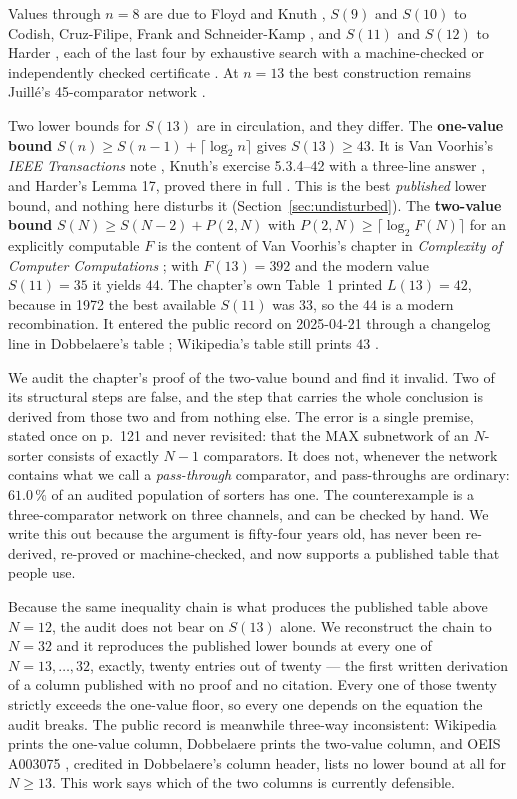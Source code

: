 \documentclass[11pt,a4paper]{article}
\begin{document}
\noindent
Values through $n=8$ are due to Floyd and Knuth \cite{FK73}, $S(9)$ and $S(10)$
to Codish, Cruz-Filipe, Frank and Schneider-Kamp \cite{CCFS16}, and $S(11)$ and
$S(12)$ to Harder \cite{Ha20}, each of the last four by exhaustive search with a
machine-checked or independently checked certificate \cite{CLS17,CS15,HaCert}.
At $n=13$ the best construction remains Juill\'e's 45-comparator network
\cite{Ju95}.

Two lower bounds for $S(13)$ are in circulation, and they differ. The
\textbf{one-value bound} $S(n) \ge S(n-1) + \lceil \log_2 n\rceil$ gives
$S(13) \ge 43$. It is Van Voorhis's \emph{IEEE Transactions} note \cite{VV72a},
Knuth's exercise 5.3.4--42 with a three-line answer \cite{Kn73}, and Harder's
Lemma 17, proved there in full \cite{Ha20}. This is the best \emph{published}
lower bound, and nothing here disturbs it (Section~\ref{sec:undisturbed}). The
\textbf{two-value bound} $S(N) \ge S(N-2) + P(2,N)$ with
$P(2,N) \ge \lceil \log_2 F(N)\rceil$ for an explicitly computable $F$ is the
content of Van Voorhis's chapter in \emph{Complexity of Computer Computations}
\cite{VV72}; with $F(13) = 392$ and the modern value $S(11) = 35$ it yields
$44$. The chapter's own Table~1 printed $L(13) = 42$, because in 1972 the best
available $S(11)$ was $33$, so the $44$ is a modern recombination. It entered
the public record on 2025-04-21 through a changelog line in Dobbelaere's table
\cite{Do25}; Wikipedia's table still prints $43$ \cite{Wik26}.

\medskip
\noindent
We audit the chapter's proof of the two-value bound and find it invalid. Two of
its structural steps are false, and the step that carries the whole conclusion is
derived from those two and from nothing else. The error is a single premise,
stated once on p.~121 and never revisited: that the MAX subnetwork of an
$N$-sorter consists of exactly $N-1$ comparators. It does not, whenever the
network contains what we call a \emph{pass-through} comparator, and
pass-throughs are ordinary: $61.0\,\%$ of an audited population of sorters has
one. The counterexample is a three-comparator network on three channels, and can
be checked by hand. We write this out because the argument
is fifty-four years old, has never been re-derived, re-proved or
machine-checked, and now supports a published table that people use.

Because the same inequality chain is what produces the published table above
$N=12$, the audit does not bear on $S(13)$ alone. We reconstruct the chain to
$N=32$ and it reproduces the published lower bounds at every one of
$N = 13,\dots,32$, exactly, twenty entries out of twenty --- the first written
derivation of a column published with no proof and no citation. Every one of
those twenty strictly exceeds the one-value floor, so every one depends on the
equation the audit breaks. The public record is meanwhile three-way
inconsistent: Wikipedia prints the one-value column, Dobbelaere prints the
two-value column, and OEIS A003075 \cite{OEIS}, credited in Dobbelaere's column
header, lists no lower bound at all for $N \ge 13$. This work says which of the
two columns is currently defensible.
\end{document}
